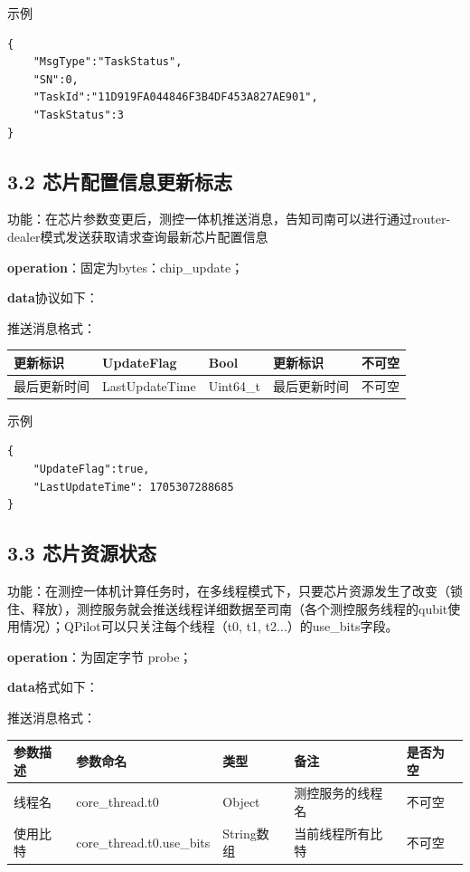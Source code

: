 \documentclass{ctexart}
\begin{document}
示例

\begin{verbatim}{
    "MsgType":"TaskStatus",
    "SN":0,
   	"TaskId":"11D919FA044846F3B4DF453A827AE901",
    "TaskStatus":3
}\end{verbatim}

\subsection{3.2 芯片配置信息更新标志}

功能：在芯片参数变更后，测控一体机推送消息，告知司南可以进行通过router-dealer模式发送获取请求查询最新芯片配置信息

\textbf{operation}：固定为bytes：chip_update；

\textbf{data}协议如下：

推送消息格式：

\begin{longtable}{|l|l|l|l|l|}
\hline
\textbf{更新标识} & \textbf{UpdateFlag} & \textbf{Bool} & \textbf{更新标识} & \textbf{不可空} \\
\hline
最后更新时间 & LastUpdateTime & Uint64_t & 最后更新时间 & 不可空 \\
\hline
\end{longtable}

示例

\begin{verbatim}{
    "UpdateFlag":true,
    "LastUpdateTime": 1705307288685
}\end{verbatim}

\subsection{3.3 芯片资源状态}

功能：在测控一体机计算任务时，在多线程模式下，只要芯片资源发生了改变（锁住、释放），测控服务就会推送线程详细数据至司南（各个测控服务线程的qubit使用情况）；QPilot可以只关注每个线程（t0, t1, t2...）的use_bits字段。

\textbf{operation}：为固定字节 probe；

\textbf{data}格式如下：

推送消息格式：

\begin{longtable}{|l|l|l|l|l|}
\hline
\textbf{\textbf{参数描述}} & \textbf{\textbf{参数命名}} & \textbf{\textbf{类型}} & \textbf{\textbf{备注}} & \textbf{\textbf{是否为空}} \\
\hline
线程名 & core_thread.t0 & Object & 测控服务的线程名 & 不可空 \\
使用比特 & core_thread.t0.use_bits & String数组 & 当前线程所有比特 & 不可空 \\
\hline
\end{longtable}
\end{document}

